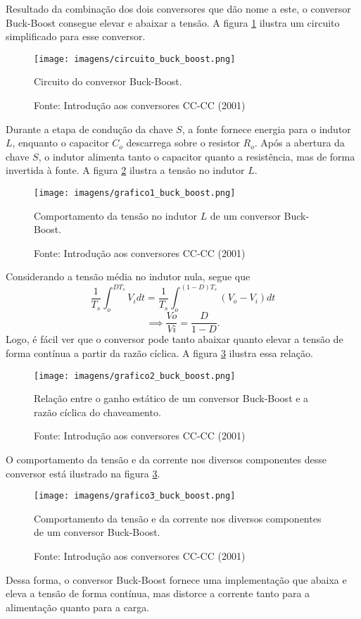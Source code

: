 Resultado da combinação dos dois conversores que dão nome a este, o conversor Buck-Boost consegue elevar e abaixar a tensão. A figura \ref{cbobu} ilustra um circuito simplificado para esse conversor.

\begin{figure}[h]
\center
\texttt{[image: imagens/circuito\_buck\_boost.png]}
\caption{Circuito do conversor Buck-Boost.}\label{cbobu} 
\caption*{Fonte: Introdução aos conversores CC-CC (2001)}
\end{figure}

Durante a etapa de condução da chave $S$, a fonte fornece energia para o indutor $L$, enquanto o capacitor $C_o$ descarrega sobre o resistor $R_o$. Após a abertura da chave $S$, o indutor alimenta tanto o capacitor quanto a resistência, mas de forma invertida à fonte. A figura \ref{g1bobu} ilustra a tensão no indutor $L$.

\begin{figure}[h]
\center
\texttt{[image: imagens/grafico1\_buck\_boost.png]}
\caption{Comportamento da tensão no indutor $L$ de um conversor Buck-Boost.}\label{g1bobu} 
\caption*{Fonte: Introdução aos conversores CC-CC (2001)}
\end{figure}

Considerando a tensão média no indutor nula, segue que \[
    \frac{1}{T_{s}}\int_{o}^{DT_{s}}V_{i}dt =  \frac{1}{T_{s}}\int_{o}^{(1-D)T_{s}}(V_{o} - V_{i})dt
\] \[
\implies\frac{V{o}}{V{i}} = \frac{D}{1-D}
.\] Logo, é fácil ver que o conversor pode tanto abaixar quanto elevar a tensão de forma contínua a partir da razão cíclica. A figura \ref{g2bobu} ilustra essa relação.

\begin{figure}[h]
\center
\texttt{[image: imagens/grafico2\_buck\_boost.png]}
\caption{Relação entre o ganho estático de um conversor Buck-Boost e a razão cíclica do chaveamento.}\label{g2bobu} 
\caption*{Fonte: Introdução aos conversores CC-CC (2001)}
\end{figure}

O comportamento da tensão e da corrente nos diversos componentes desse conversor está ilustrado na figura \ref{g2bobu}.

\begin{figure}[h]
\center
\texttt{[image: imagens/grafico3\_buck\_boost.png]}
\caption{Comportamento da tensão e da corrente nos diversos componentes de um conversor Buck-Boost.}\label{g3bobu} 
\caption*{Fonte: Introdução aos conversores CC-CC (2001)}
\end{figure}

Dessa forma, o conversor Buck-Boost fornece uma implementação que abaixa e eleva a tensão de forma contínua, mas distorce a corrente tanto para a alimentação quanto para a carga.

